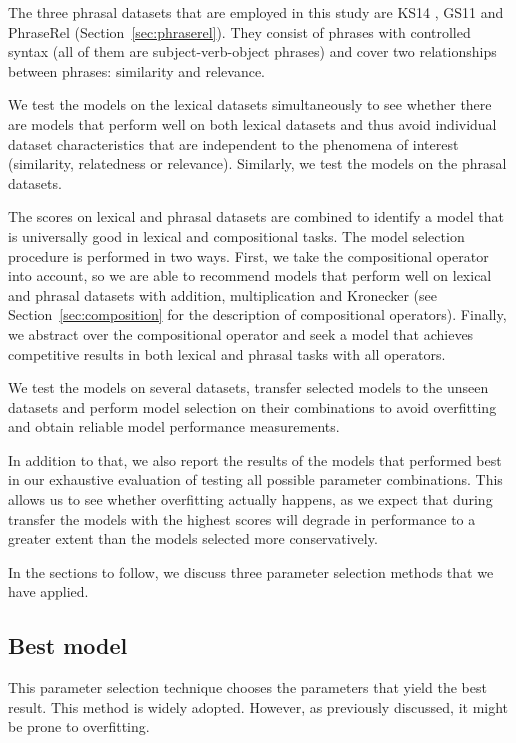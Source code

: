 The three phrasal  datasets that are employed in this study are KS14 \cite{kartsadrqpl2014}, GS11 \cite{Grefenstette:2011:ESC:2145432.2145580} and PhraseRel (Section~\ref{sec:phraserel}). They consist of phrases with controlled syntax (all of them are subject-verb-object phrases) and cover two relationships between phrases: similarity and relevance.

We test the models on the lexical datasets simultaneously to see whether there are models that perform well on both lexical datasets and thus avoid individual dataset characteristics that are independent to the phenomena of interest (similarity, relatedness or relevance). Similarly, we test the models on the phrasal datasets.

The scores on lexical and phrasal datasets are combined to identify a model that is universally good in lexical and compositional tasks. The model selection procedure is performed in two ways. First, we take the compositional operator into account, so we are able to recommend models that perform well on lexical and phrasal datasets with addition, multiplication and Kronecker (see Section~\ref{sec:composition} for the description of compositional operators). Finally, we abstract over the compositional operator and seek a model that achieves competitive results in both lexical and phrasal tasks with all operators.

We test the models on several datasets, transfer selected models to the unseen datasets and perform model selection on their combinations to avoid overfitting and obtain reliable model performance measurements.

In addition to that, we also report the results of the models that performed best in our exhaustive evaluation of testing all possible parameter combinations. This allows us to see whether overfitting actually happens, as we expect that during transfer the models with the highest scores will degrade in performance to a greater extent than the models selected more conservatively.

In the sections to follow, we discuss three parameter selection methods that we have applied.

\subsection{Best model}

This parameter selection technique chooses the parameters that yield the best result. This method is widely adopted.
However, as previously discussed, it might be prone to overfitting.

